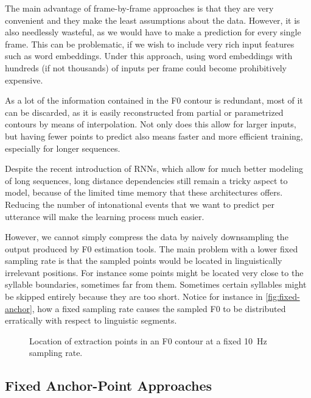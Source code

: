 The main advantage of frame-by-frame approaches is that they are very convenient and they make the least assumptions about the data. 
However, it is also needlessly wasteful, as we would have to make a prediction for every single frame.
This can be problematic, if we wish to include very rich input features such as word embeddings.
Under this approach, using word embeddings with hundreds (if not thousands) of inputs per frame could become prohibitively expensive.

As a lot of the information contained in the \ac{F0} contour is redundant, most of it can be discarded, as it is easily reconstructed from partial or parametrized contours by means of interpolation.
Not only does this allow for larger inputs, but having fewer points to predict also means faster and more efficient training, especially for longer sequences.

Despite the recent introduction of \acp{RNN}, which allow for much better modeling of long sequences, long distance dependencies still remain a tricky aspect to model, because of the limited time memory that these architectures offers.
Reducing the number of intonational events that we want to predict per utterance will make the learning process much easier.

However, we cannot simply compress the data by naively downsampling the output produced by \ac{F0} estimation tools. 
The main problem with a lower fixed sampling rate is that the sampled points would be located in linguistically irrelevant positions.
For instance some points might be located very close to the syllable boundaries, sometimes far from them. 
Sometimes certain syllables might be skipped entirely because they are too short.
Notice for instance in \autoref{fig:fixed-anchor}, how a fixed sampling rate causes the sampled \ac{F0} to be distributed erratically with respect to linguistic segments.



\begin{figure}[h]
\centering
\resizebox{\textwidth}{!}{}
\caption[Fixed sampling rate]{Location of extraction points in an \ac{F0} contour at a fixed 10~Hz sampling rate.}
\label{fig:fixed-anchor}
\end{figure}



\subsection{Fixed Anchor-Point Approaches}

